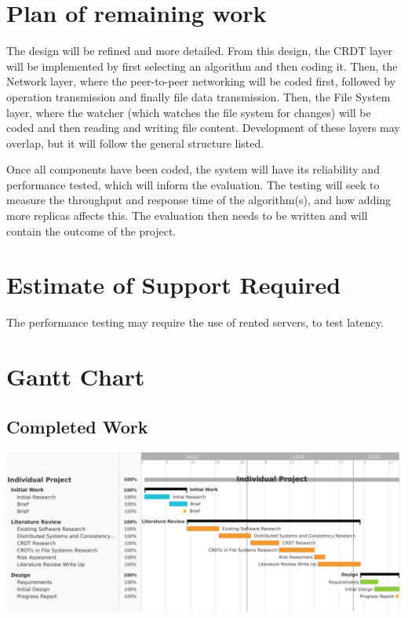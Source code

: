 \documentclass[12pt]{report}
\begin{document}
\section{Plan of remaining work}
The design will be refined and more detailed. From this design, the CRDT layer will be implemented by first selecting an algorithm and then coding it. Then, the Network layer, where the peer-to-peer networking will be coded first, followed by operation transmission and finally file data transmission. Then, the File System layer, where the watcher (which watches the file system for changes) will be coded and then reading and writing file content. Development of these layers may overlap, but it will follow the general structure listed. \par
Once all components have been coded, the system will have its reliability and performance tested, which will inform the evaluation. The testing will seek to measure the throughput and response time of the algorithm(s), and how adding more replicas affects this. The evaluation then needs to be written and will contain the outcome of the project.

\section{Estimate of Support Required}
The performance testing may require the use of rented servers, to test latency.

\section{Gantt Chart}

\subsection{Completed Work}
\includegraphics[width=16cm]{images/completed.jpg}
\end{document}
